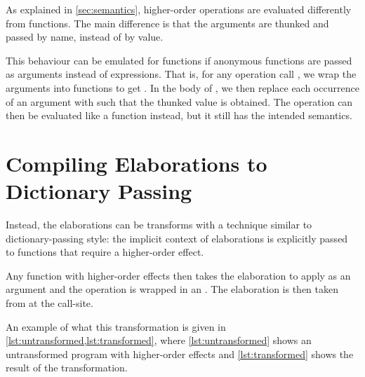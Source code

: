 As explained in \cref{sec:semantics}, higher-order operations are evaluated differently from functions. The main difference is that the arguments are thunked and passed by name, instead of by value. 

This behaviour can be emulated for functions if anonymous functions are passed as arguments instead of expressions. That is, for any operation call , we wrap the arguments into functions to get . In the body of , we then replace each occurrence of an argument  with  such that the thunked value is obtained. The  operation can then be evaluated like a function instead, but it still has the intended semantics.

\section{Compiling Elaborations to Dictionary Passing}


Instead, the elaborations can be transforms with a technique similar to dictionary-passing style: the implicit context of elaborations is explicitly passed to functions that require a higher-order effect.

Any function with higher-order effects then takes the elaboration to apply as an argument and the operation is wrapped in an . The elaboration is then taken from  at the call-site.

An example of what this transformation is given in \cref{lst:untransformed,lst:transformed}, where \cref{lst:untransformed} shows an untransformed program with higher-order effects and \cref{lst:transformed} shows the result of the transformation.

